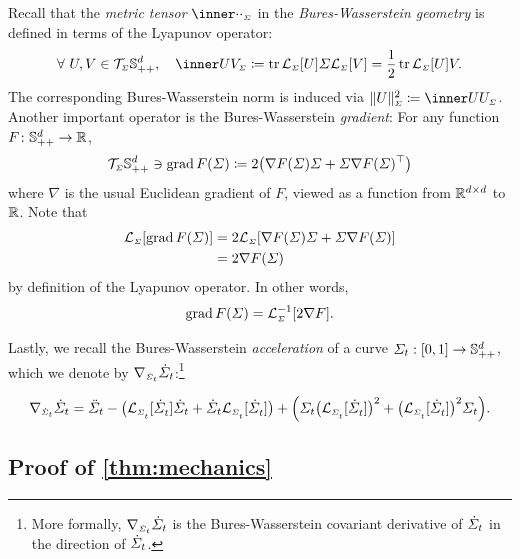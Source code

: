 Recall that the \emph{metric tensor} $\innerBW[\cdot][\cdot][\Sigma]$ in the \emph{Bures-Wasserstein geometry} \citep{takatsu2010wasserstein} is defined in terms of the Lyapunov operator: 
\begin{align}
\label{eq:BW-tensor}
\forall\ U, V\in \tspace, \quad \innerBW[U][V][\Sigma] \defeq \tr\lyap[\Sigma][U]\Sigma\lyap[\Sigma][V] = \frac{1}{2}\tr \lyap[\Sigma][U]V.
\end{align}The corresponding Bures-Wasserstein norm is induced via $\normBWsq[U][\Sigma] \defeq \innerBW[U][U][\Sigma]$.
Another important operator is the Bures-Wasserstein \emph{gradient}: For any function $F \colon \mathbb{S}_{++}^d \to \mathbb{R}$, 
\begin{equation}
\label{eq:gradBW-def}
\tspace\ni \gradBW F(\Sigma) \defeq 2 \parens*{ \nabla F(\Sigma)\Sigma + \Sigma \nabla F(\Sigma)^\top }
\end{equation}where $\nabla$ is the usual Euclidean gradient of $F$, viewed as a function from $\mathbb{R}^{d\times d}$ to $\mathbb{R}$. Note that
\begin{align}
\lyap[\Sigma][\gradBW F(\Sigma)] &= 2 \lyap[\Sigma][\nabla F(\Sigma)\Sigma + \Sigma\nabla F(\Sigma)] \\
&= 2 \nabla F(\Sigma)
\end{align}by definition of the Lyapunov operator. In other words,
\begin{align}
\label{eq:gradBW-lyapinv}
\gradBW F(\Sigma) = \lyapinv.
\end{align}


Lastly, we recall the Bures-Wasserstein \emph{acceleration} of a curve $\Sigma_{t}: [0,1] \to \mathbb{S}_{++}^d$, which we denote by $\nabla_{\scriptscriptstyle\dot{\Sigma}_{t}}\dot{\Sigma}_{t}$:\footnote{More formally, $\nabla_{\scriptscriptstyle\dot{\Sigma}_{t}}\dot{\Sigma}_{t}$ is the Bures-Wasserstein covariant derivative of $\dot{\Sigma}_{t}$ in the direction of $\dot{\Sigma}_{t}$.}

\begin{align}
\label{eq:coderBW}
\coder = \ddSigcurve -  \parens*{  \lyap \dSigcurve + \dSigcurve\lyap } + \parens*{ \Sigcurve \parens*{\lyap}^2 + \parens*{\lyap}^2 \Sigcurve}.
\end{align}





\subsection{Proof of \cref{thm:mechanics}}
\label{app:proofmechanics}


